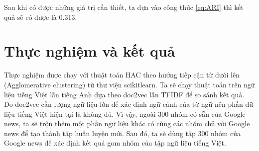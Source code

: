 Sau khi có được những giá trị cần thiết, ta dựa vào công thức \ref{eq:ARI} thì kết quả sẽ có được là $0.313$.

%
%		
%		
%
%
%

\section{Thực nghiệm và kết quả}
Thực nghiệm được chạy với thuật toán HAC theo hướng tiếp cận từ dưới lên (Agglomerative clustering) từ thư viện scikitlearn.
Ta sẽ chạy thuật toán trên ngữ liệu tiếng Việt lẫn tiếng Anh dựa theo doc2vec lẫn TFIDF để so sánh kết quả.
Do doc2vec cần lượng ngữ liệu lớn để xác định ngữ cảnh của từ ngữ nên phần dữ liệu tiếng Việt hiện tại là không đủ.
Vì vậy, ngoài 300 nhóm có sẵn của Google news, ta sẽ trộn thêm một phần ngữ liệu khác có cùng các nhóm chủ với Google news để tạo thành tập huấn luyện mới.
Sau đó, ta sẽ dùng tập 300 nhóm của Google news để xác định kết quả gom nhóm của tập ngữ liệu tiếng Việt.

